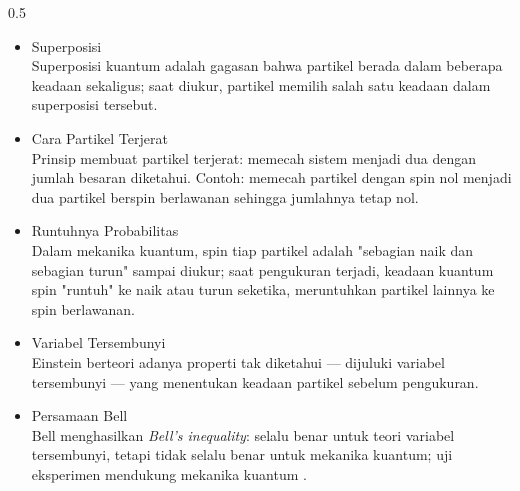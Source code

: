 \begin{frame}
\begin{columns}[T]
        \begin{column}{0.5\textwidth}
            \begin{itemize}\tiny\justifying
                \item Superposisi \\
                    Superposisi kuantum adalah gagasan bahwa partikel berada
                    dalam beberapa keadaan sekaligus; saat diukur, partikel
                    memilih salah satu keadaan dalam superposisi tersebut.
                \item Cara Partikel Terjerat \\
                    Prinsip membuat partikel terjerat: memecah sistem menjadi
                    dua dengan jumlah besaran diketahui. Contoh: memecah
                    partikel dengan spin nol menjadi dua partikel berspin
                    berlawanan sehingga jumlahnya tetap nol.
                \item Runtuhnya Probabilitas \\
                    Dalam mekanika kuantum, spin tiap partikel adalah
                    "sebagian naik dan sebagian turun" sampai diukur; saat
                    pengukuran terjadi, keadaan kuantum spin "runtuh" ke naik
                    atau turun seketika, meruntuhkan partikel lainnya ke spin
                    berlawanan.
                \item Variabel Tersembunyi \\
                    Einstein berteori adanya properti tak diketahui --- dijuluki
                    variabel tersembunyi --- yang menentukan keadaan partikel
                    sebelum pengukuran.
                \item Persamaan Bell \\
                    Bell menghasilkan \textit{Bell's inequality}: selalu benar
                    untuk teori variabel tersembunyi, tetapi tidak selalu benar
                    untuk mekanika kuantum; uji eksperimen mendukung mekanika
                    kuantum \cite{aspect1999bell}.
            \end{itemize}
        \end{column}
    \end{columns}
\end{frame}
